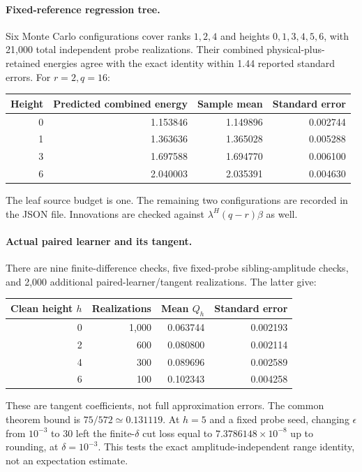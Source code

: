 \documentclass[11pt,oneside,openany,a4paper]{book}
\numberwithin{equation}{chapter}
\theoremstyle{definition}
\theoremstyle{remark}
\begin{document}
\paragraph{Fixed-reference regression tree.}
Six Monte Carlo configurations cover ranks $1,2,4$ and heights $0,1,3,4,5,6$, with 21,000 total independent probe realizations. Their combined physical-plus-retained energies agree with the exact identity within 1.44 reported standard errors. For $r=2,q=16$:
\begin{center}
\begin{tabular}{rrrr}
\toprule Height&Predicted combined energy&Sample mean&Standard error\\\midrule
0&1.153846&1.149896&0.002744\\
1&1.363636&1.365028&0.005288\\
3&1.697588&1.694770&0.006100\\
6&2.040003&2.035391&0.004630\\\bottomrule
\end{tabular}
\end{center}
The leaf source budget is one. The remaining two configurations are recorded in the JSON file. Innovations are checked against $\lambda^H(q-r)\beta$ as well.

\paragraph{Actual paired learner and its tangent.}
There are nine finite-difference checks, five fixed-probe sibling-amplitude checks, and 2,000 additional paired-learner/tangent realizations. The latter give:
\begin{center}
\begin{tabular}{rrrr}
\toprule Clean height $h$&Realizations&Mean $Q_h$&Standard error\\\midrule
0&1,000&0.063744&0.002193\\
2&600&0.080800&0.002114\\
4&300&0.089696&0.002589\\
6&100&0.102343&0.004258\\\bottomrule
\end{tabular}
\end{center}
These are tangent coefficients, not full approximation errors. The common theorem bound is $75/572\simeq0.131119$. At $h=5$ and a fixed probe seed, changing $\epsilon$ from $10^{-3}$ to $30$ left the finite-$\delta$ cut loss equal to $7.3786148\times10^{-8}$ up to rounding, at $\delta=10^{-3}$. This tests the exact amplitude-independent range identity, not an expectation estimate.
\end{document}
